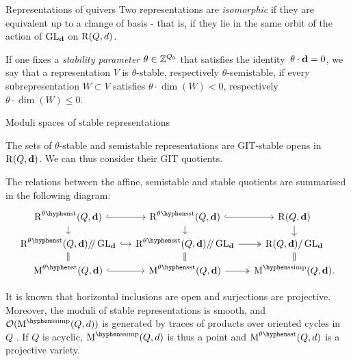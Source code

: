 \documentclass[final,20pt]{beamer}
\newlength{\colwidth}
\begin{document}
\begin{frame}[t, fragile]
\begin{columns}[t]
\begin{column}{\colwidth}
\begin{block}{Representations of quivers}
    Two representations are \emph{isomorphic} if they are equivalent up to
    a change of basis -
    that is, if they lie in the same orbit of the action
    of $\operatorname{GL}_{\mathbf{d}}$ on $\operatorname{R}(Q, d)$.

    If one fixes a \emph{stability parameter} $\theta \in \mathbb{Z}^{Q_0}$ that satisfies
    the identity~$\theta\cdot\mathbf{d}=0$, we say that a representation $V$
    is $\theta$-stable, respectively $\theta$-semistable,
    if every subrepresentation $W \subset V$ satisfies
    $\theta \cdot \dim(W) < 0$, respectively
    $\theta\cdot\dim(W)\leq 0$.

  \end{block}

  \begin{block}{Moduli spaces of stable representations}

    The sets of $\theta$-stable and semistable representations
    are GIT-stable opens in $\operatorname{R}(Q, \mathbf{d})$.
    We can thus consider their GIT quotients.

    The relations between the affine, semistable and stable quotients are summarised in the following diagram:
    \begin{equation}
      \begin{tikzcd}[row sep=small, column sep=small, ampersand replacement=\&]
        \repspace^{\theta\stable}(Q, \tuple{d}) \arrow[r,hook] \arrow[d]     \& \repspace^{\theta\semistable}(Q, \tuple{d}) \arrow[r,hook] \arrow[d]     \& \repspace(Q, \tuple{d}) \arrow[d] \\
        \repspace^{\theta\stable}(Q, \tuple{d})\gitquot\GLd \arrow[r, hook] \arrow[d, equal] \& \repspace^{\theta\semistable}(Q, \tuple{d})\gitquot\GLd \arrow[r, two heads] \arrow[d, equal] \& \repspace(Q, \tuple{d}) / \GLd \arrow[d, equal] \\
        \modulispace^{\theta\stable}(Q, \tuple{d}) \arrow[r, hook]          \& \modulispace^{\theta\semistable}(Q, \tuple{d}) \arrow[r, two heads]                \& \modulispace^{\semisimple}(Q, \tuple{d}).
      \end{tikzcd}
    \end{equation}

    It is known that horizontal inclusions are open and surjections are projective.
    Moreover, the moduli of stable representations is smooth, and
    $\mathcal{O}(\modulispace^{\semisimple}(Q, d))$ is generated by traces of products over
    oriented cycles in $Q$ \cite{MR958897}.
    If $Q$ is acyclic, $\modulispace^{\semisimple}(Q, d)$ is thus a point
    and $\modulispace^{\theta\semistable}(Q, d)$ is a projective variety.


\end{block}
\end{column}
\end{columns}
\end{frame}
\end{document}
